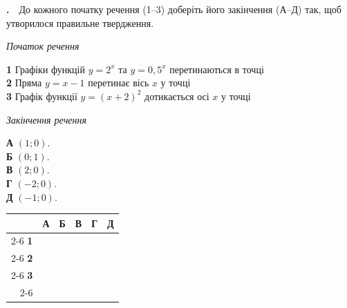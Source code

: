 \documentclass[12pt]{article}
\newcommand{\matchingGrid}{%
    \begingroup
    \renewcommand{\arraystretch}{1.15}
    \setlength{\tabcolsep}{4pt}
    \footnotesize
    \begin{tabular}{r|c|c|c|c|c|}
         \multicolumn{1}{c}{} & \multicolumn{1}{c}{\textbf{А}} & \multicolumn{1}{c}{\textbf{Б}} & \multicolumn{1}{c}{\textbf{В}} & \multicolumn{1}{c}{\textbf{Г}} & \multicolumn{1}{c}{\textbf{Д}} \\ \cline{2-6}
         \textbf{1} & \phantom{X} & \phantom{X} & \phantom{X} & \phantom{X} & \phantom{X} \\ \cline{2-6}
         \textbf{2} & & & & & \\ \cline{2-6}
         \textbf{3} & & & & & \\ \cline{2-6}
    \end{tabular}
    \endgroup
}
\newcounter{zad}
\newcommand{\zadtask}[1]{\stepcounter{zad}\par\vspace{0.3cm}\noindent\textbf{\thezad.}\ \ #1\par\vspace{0.2cm}}
\begin{document}
\zadtask{До кожного початку речення (1--3) доберіть його закінчення (А--Д) так, щоб утворилося правильне твердження.\par
\vspace{0.3cm}
\noindent
\begin{minipage}[t]{0.50\textwidth}
\textit{Початок речення}\par\vspace{0.15cm}
\textbf{1} \quad Графіки функцій $y = 2^x$ та $y = 0{,}5^x$ перетинаються в точці\\[0.25cm]
\textbf{2} \quad Пряма $y = x - 1$ перетинає вісь $x$ у точці\\[0.25cm]
\textbf{3} \quad Графік функції $y = (x + 2)^2$ дотикається осі $x$ у точці
\end{minipage}%
\hfill
\begin{minipage}[t]{0.28\textwidth}
\textit{Закінчення речення}\par\vspace{0.15cm}
\textbf{А} \quad $(1; 0)$.\\[0.15cm]
\textbf{Б} \quad $(0; 1)$.\\[0.15cm]
\textbf{В} \quad $(2; 0)$.\\[0.15cm]
\textbf{Г} \quad $(-2; 0)$.\\[0.15cm]
\textbf{Д} \quad $(-1; 0)$.
\end{minipage}%
\hfill
\begin{minipage}[t]{0.18\textwidth}
\vspace{0.4cm}
\begin{flushright}\matchingGrid\end{flushright}
\end{minipage}}
\end{document}
